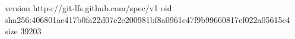version https://git-lfs.github.com/spec/v1
oid sha256:406801ae417b0fa22d07e2e200981bf8a0961c47f9b99660817cf022a05615c4
size 39203

